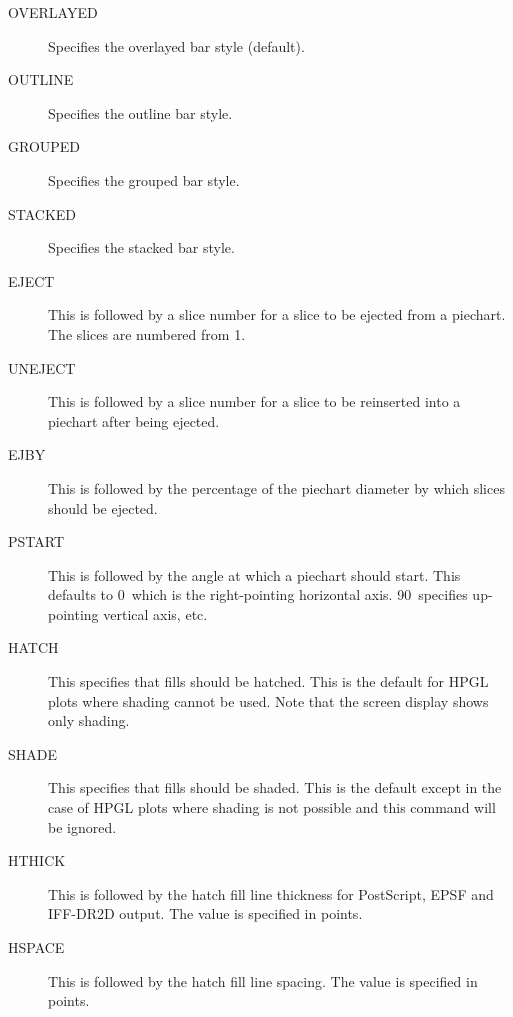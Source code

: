 \begin{description}
\item[OVERLAYED] Specifies the overlayed bar style (default).
\item[OUTLINE] Specifies the outline bar style.
\item[GROUPED] Specifies the grouped bar style.
\item[STACKED] Specifies the stacked bar style.
\item[EJECT] This is followed by  a slice number for a slice to be ejected from a 
piechart. The slices are numbered from 1.
\item[UNEJECT\dag] This is followed by  a slice number for a slice to be reinserted into 
a piechart after being ejected.
\item[EJBY] This is followed by the percentage of the piechart diameter by which 
slices should be ejected.
\item[PSTART] This is followed by the angle at which a piechart should start. This 
defaults to 0\degree\ which is the right-pointing horizontal axis. 90\degree\ 
specifies up-pointing vertical axis, etc.
\item[HATCH] This specifies that fills should be hatched. This is the default for 
HPGL plots where shading cannot be used. Note that the screen display shows only 
shading.
\item[SHADE] This specifies that fills should be shaded. This is the default except 
in the case of HPGL plots where shading is not possible and this command will be 
ignored.
\item[HTHICK] This is followed by the hatch fill line thickness for PostScript, EPSF 
and IFF-DR2D output. The value is specified in points.
\item[HSPACE] This is followed by the hatch fill line spacing. The value is 
specified in points.
\end{description}

